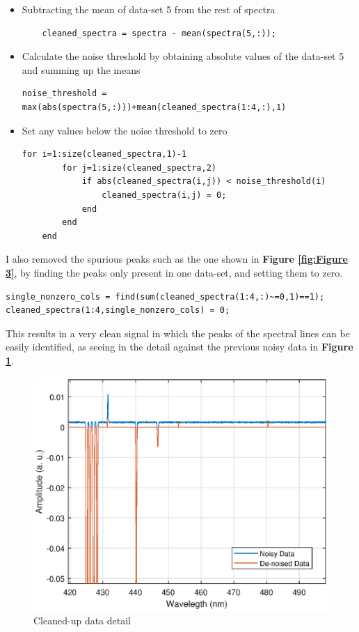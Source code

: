 \begin{itemize}
\item Subtracting the mean of data-set 5 from the rest of spectra
    \begin{lstlisting}
    cleaned_spectra = spectra - mean(spectra(5,:));
    \end{lstlisting}
    \item Calculate the noise threshold by obtaining absolute values of the data-set 5 and summing up the means
    \begin{lstlisting}
noise_threshold = max(abs(spectra(5,:)))+mean(cleaned_spectra(1:4,:),1)
\end{lstlisting}
    \item Set any values below the noise threshold to zero
    \begin{lstlisting}
for i=1:size(cleaned_spectra,1)-1
        for j=1:size(cleaned_spectra,2)
            if abs(cleaned_spectra(i,j)) < noise_threshold(i)
                cleaned_spectra(i,j) = 0;
            end
        end
    end
\end{lstlisting}
\end{itemize}

I also removed the spurious peaks such as the one shown in \textbf{Figure \ref{fig:Figure 3}}, by finding the peaks only present in one data-set, and setting them to zero.

\begin{lstlisting}
single_nonzero_cols = find(sum(cleaned_spectra(1:4,:)~=0,1)==1);
cleaned_spectra(1:4,single_nonzero_cols) = 0;
\end{lstlisting}

This results in a very clean signal in which the peaks of the spectral lines can be easily identified, as seeing in the detail against the previous noisy data in \textbf{Figure \ref{fig:Figure 11}}.

\begin{figure}[H]
    \centering
    \includegraphics[width = 1\textwidth ]{figures/cleanedUpSpectra.eps}
    \caption{Cleaned-up data detail}
    \label{fig:Figure 11}
\end{figure}